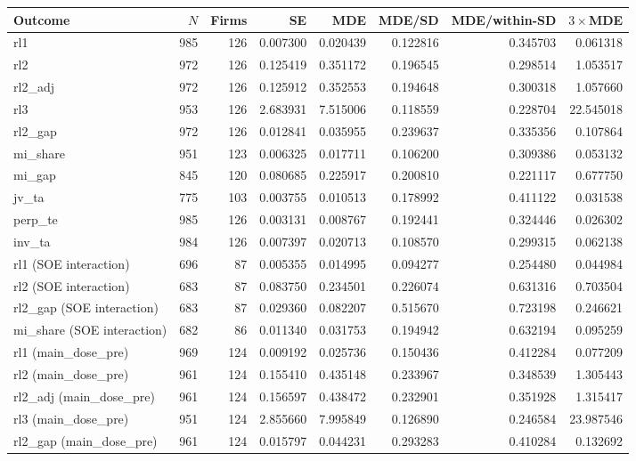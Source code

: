\begingroup\scriptsize\setlength{\tabcolsep}{3pt}
\noindent
\begin{tabular}{lrrrrrrr}
\toprule
Outcome & $N$ & Firms & SE & MDE & MDE/SD & MDE/within-SD & $3\times$MDE \\
\midrule
rl1 & 985 & 126 & 0.007300 & 0.020439 & 0.122816 & 0.345703 & 0.061318 \\
rl2 & 972 & 126 & 0.125419 & 0.351172 & 0.196545 & 0.298514 & 1.053517 \\
rl2\_adj & 972 & 126 & 0.125912 & 0.352553 & 0.194648 & 0.300318 & 1.057660 \\
rl3 & 953 & 126 & 2.683931 & 7.515006 & 0.118559 & 0.228704 & 22.545018 \\
rl2\_gap & 972 & 126 & 0.012841 & 0.035955 & 0.239637 & 0.335356 & 0.107864 \\
mi\_share & 951 & 123 & 0.006325 & 0.017711 & 0.106200 & 0.309386 & 0.053132 \\
mi\_gap & 845 & 120 & 0.080685 & 0.225917 & 0.200810 & 0.221117 & 0.677750 \\
jv\_ta & 775 & 103 & 0.003755 & 0.010513 & 0.178992 & 0.411122 & 0.031538 \\
perp\_te & 985 & 126 & 0.003131 & 0.008767 & 0.192441 & 0.324446 & 0.026302 \\
inv\_ta & 984 & 126 & 0.007397 & 0.020713 & 0.108570 & 0.299315 & 0.062138 \\
\midrule
rl1 (SOE interaction) & 696 & 87 & 0.005355 & 0.014995 & 0.094277 & 0.254480 & 0.044984 \\
rl2 (SOE interaction) & 683 & 87 & 0.083750 & 0.234501 & 0.226074 & 0.631316 & 0.703504 \\
rl2\_gap (SOE interaction) & 683 & 87 & 0.029360 & 0.082207 & 0.515670 & 0.723198 & 0.246621 \\
mi\_share (SOE interaction) & 682 & 86 & 0.011340 & 0.031753 & 0.194942 & 0.632194 & 0.095259 \\
\midrule
rl1 (main\_dose\_pre) & 969 & 124 & 0.009192 & 0.025736 & 0.150436 & 0.412284 & 0.077209 \\
rl2 (main\_dose\_pre) & 961 & 124 & 0.155410 & 0.435148 & 0.233967 & 0.348539 & 1.305443 \\
rl2\_adj (main\_dose\_pre) & 961 & 124 & 0.156597 & 0.438472 & 0.232901 & 0.351928 & 1.315417 \\
rl3 (main\_dose\_pre) & 951 & 124 & 2.855660 & 7.995849 & 0.126890 & 0.246584 & 23.987546 \\
rl2\_gap (main\_dose\_pre) & 961 & 124 & 0.015797 & 0.044231 & 0.293283 & 0.410284 & 0.132692 \\

\end{tabular}
